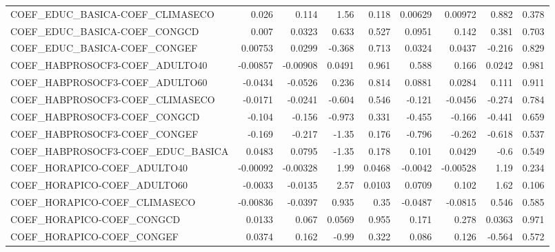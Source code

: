 \begin{tabular}{lrrrrrrrr}
COEF\_EDUC\_BASICA-COEF\_CLIMASECO        &       0.026 &        0.114 &     1.56 &    0.118 &    0.00629 &     0.00972 &        0.882 &         0.378 \\
COEF\_EDUC\_BASICA-COEF\_CONGCD           &       0.007 &       0.0323 &    0.633 &    0.527 &     0.0951 &       0.142 &        0.381 &         0.703 \\
COEF\_EDUC\_BASICA-COEF\_CONGEF           &     0.00753 &       0.0299 &   -0.368 &    0.713 &     0.0324 &      0.0437 &       -0.216 &         0.829 \\
COEF\_HABPROSOCF3-COEF\_ADULTO40         &    -0.00857 &     -0.00908 &   0.0491 &    0.961 &      0.588 &       0.166 &       0.0242 &         0.981 \\
COEF\_HABPROSOCF3-COEF\_ADULTO60         &     -0.0434 &      -0.0526 &    0.236 &    0.814 &     0.0881 &      0.0284 &        0.111 &         0.911 \\
COEF\_HABPROSOCF3-COEF\_CLIMASECO        &     -0.0171 &      -0.0241 &   -0.604 &    0.546 &     -0.121 &     -0.0456 &       -0.274 &         0.784 \\
COEF\_HABPROSOCF3-COEF\_CONGCD           &      -0.104 &       -0.156 &   -0.973 &    0.331 &     -0.455 &      -0.166 &       -0.441 &         0.659 \\
COEF\_HABPROSOCF3-COEF\_CONGEF           &      -0.169 &       -0.217 &    -1.35 &    0.176 &     -0.796 &      -0.262 &       -0.618 &         0.537 \\
COEF\_HABPROSOCF3-COEF\_EDUC\_BASICA      &      0.0483 &       0.0795 &    -1.35 &    0.178 &      0.101 &      0.0429 &         -0.6 &         0.549 \\
COEF\_HORAPICO-COEF\_ADULTO40            &    -0.00092 &     -0.00328 &     1.99 &   0.0468 &    -0.0042 &    -0.00528 &         1.19 &         0.234 \\
COEF\_HORAPICO-COEF\_ADULTO60            &     -0.0033 &      -0.0135 &     2.57 &   0.0103 &     0.0709 &       0.102 &         1.62 &         0.106 \\
COEF\_HORAPICO-COEF\_CLIMASECO           &    -0.00836 &      -0.0397 &    0.935 &     0.35 &    -0.0487 &     -0.0815 &        0.546 &         0.585 \\
COEF\_HORAPICO-COEF\_CONGCD              &      0.0133 &        0.067 &   0.0569 &    0.955 &      0.171 &       0.278 &       0.0363 &         0.971 \\
COEF\_HORAPICO-COEF\_CONGEF              &      0.0374 &        0.162 &    -0.99 &    0.322 &      0.086 &       0.126 &       -0.564 &         0.572 \\

\end{tabular}
